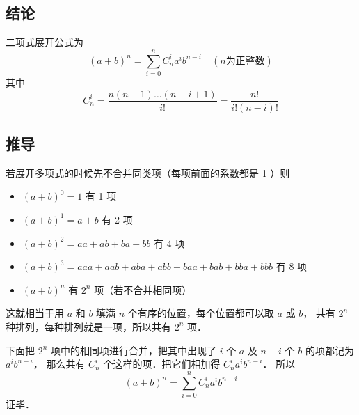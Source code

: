 

\subsection{结论}
二项式展开公式为
\begin{equation}
(a + b)^n = \sum_{i = 0}^n  C_n^i a^i b^{n - i} \quad (n \text{为正整数})
\end{equation}
其中
\begin{equation}
C_n^i = \frac{n(n - 1)\dots (n - i + 1)}{i!} = \frac{n!}{i!(n - i)!}
\end{equation}

\subsection{推导}
若展开多项式的时候先不合并同类项（每项前面的系数都是 1 ）则
\begin{itemize}
\item $(a + b)^0 = 1$ 有 1 项
\item $(a + b)^1 = a + b$ 有 2 项
\item $(a + b)^2 = aa + ab + ba + bb$ 有 4 项
\item $(a + b)^3 = aaa + aab + aba + abb + baa + bab + bba + bbb$ 有 8 项
\item $(a + b)^n$ 有 $2^n$ 项（若不合并相同项）
\end{itemize}

这就相当于用 $a$ 和 $b$ 填满 $n$ 个有序的位置，每个位置都可以取 $a$ 或 $b$， 共有 $2^n$ 种排列，每种排列就是一项，所以共有 $2^n$ 项．

下面把 $2^n$ 项中的相同项进行合并，把其中出现了 $i$ 个 $a$ 及 $n-i$ 个 $b$ 的项都记为 $a^i b^{n-i}$， 那么共有 $C_n^i$ 个这样的项．把它们相加得 $C_n^i a^i b^{n-i}$． 所以
\begin{equation}
(a + b)^n = \sum_{i = 0}^n  C_n^i a^i b^{n - i}
\end{equation}
证毕．
